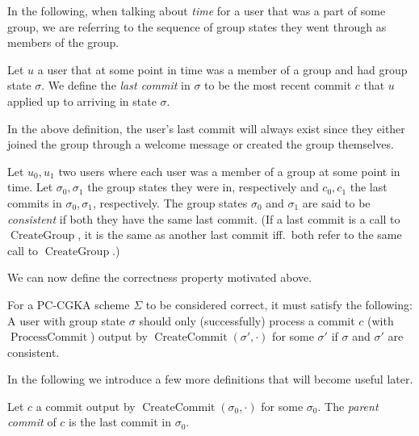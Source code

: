 In the following, when talking about \emph{time} for a user that was a part of some group, we are referring to the sequence of group states they went through as members of the group.

\begin{definition}
	Let $u$ a user that at some point in time was a member of a group and had group state $\sigma$. We define the \emph{last commit} in $\sigma$ to be the most recent commit $c$ that $u$ applied up to arriving in state $\sigma$.
\end{definition}

In the above definition, the user's last commit will always exist since they either joined the group through a welcome message or created the group themselves.

\begin{definition} \label{def:consistent-group-state}
	Let $u_0, u_1$ two users where each user was a member of a group at some point in time. Let $\sigma_0, \sigma_1$ the group states they were in, respectively and $c_0, c_1$ the last commits in $\sigma_0, \sigma_1$, respectively. The group states $\sigma_0$ and $\sigma_1$ are said to be \emph{consistent} if both they have the same last commit. (If a last commit is a call to $\operatorname{CreateGroup}$, it is the same as another last commit iff.\ both refer to the same call to $\operatorname{CreateGroup}$.)
\end{definition}

We can now define the correctness property motivated above.


\begin{definition} \label{def:cgka-correctness-same-history}
	For a PC-CGKA scheme $\Sigma$ to be considered correct, it must satisfy the following: A user with group state $\sigma$ should only (successfully) process a commit $c$ (with $\operatorname{ProcessCommit}$) output by $\operatorname{CreateCommit}(\sigma', \cdot)$ for some $\sigma'$ if $\sigma$ and $\sigma'$ are consistent.
\end{definition}

In the following we introduce a few more definitions that will become useful later.

\begin{lemma}
	Let $c$ a commit output by $\operatorname{CreateCommit}(\sigma_0, \cdot)$ for some $\sigma_0$. The \emph{parent commit} of $c$ is the last commit in $\sigma_0$.
\end{lemma}

